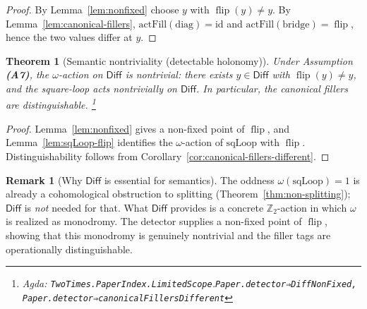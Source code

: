 \documentclass{article}
\newcommand{\Diff}{\mathsf{Diff}}
\newcommand{\flip}{\operatorname{flip}}
\newcommand{\Ztwo}{\mathbb{Z}_2}
\newcommand{\Agda}[1]{\texttt{#1}}
\newcommand{\AgdaRef}[2]{\emph{Agda: }\Agda{#1}.\Agda{#2}}
\newcommand{\AgdaNote}[2]{\footnote{\AgdaRef{#1}{#2}}}
\theoremstyle{definition}
\newtheorem{remark}{Remark}[section]
\theoremstyle{plain}
\newtheorem{theorem}{Theorem}[section]
\begin{document}
\begin{proof}
By Lemma~\ref{lem:nonfixed} choose $y$ with $\flip(y)\ne y$. By
Lemma~\ref{lem:canonical-fillers}, $\mathrm{actFill}(\mathrm{diag})=\mathrm{id}$
and $\mathrm{actFill}(\mathrm{bridge})=\flip$, hence the two values differ at $y$.
\end{proof}

\begin{theorem}[Semantic nontriviality (detectable holonomy)]
\label{thm:semantic-nontriviality}
Under Assumption \textbf{(A7)}, the $\omega$-action on $\Diff$ is nontrivial:
there exists $y\in\Diff$ with $\flip(y)\neq y$, and the square-loop acts
nontrivially on $\Diff$. In particular, the canonical fillers are distinguishable.
\AgdaNote{TwoTimes.PaperIndex.LimitedScope}{Paper.detector⇒DiffNonFixed, Paper.detector⇒canonicalFillersDifferent}
\end{theorem}

\begin{proof}
Lemma~\ref{lem:nonfixed} gives a non-fixed point of $\flip$, and
Lemma~\ref{lem:sqLoop-flip} identifies the $\omega$-action of $\mathrm{sqLoop}$
with $\flip$. Distinguishability follows from Corollary~\ref{cor:canonical-fillers-different}.
\end{proof}

\begin{remark}[Why $\Diff$ is essential for semantics]
\label{rem:limited-scope-theorem-translation-007}
The oddness $\omega(\mathrm{sqLoop})=1$ is already a cohomological obstruction to
splitting (Theorem~\ref{thm:non-splitting}); $\Diff$ is \emph{not} needed for that.
What $\Diff$ provides is a concrete $\Ztwo$-action in which $\omega$ is realized as
monodromy. The detector supplies a non-fixed point of $\flip$, showing that this
monodromy is genuinely nontrivial and the filler tags are operationally distinguishable.
\end{remark}
\end{document}
